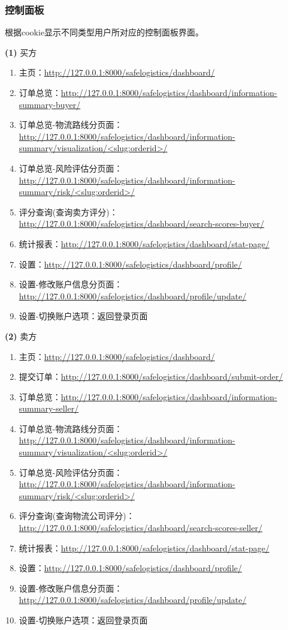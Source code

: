 \documentclass[12pt]{article}
\begin{document}
\subsubsection{控制面板} \par
根据cookie显示不同类型用户所对应的控制面板界面。\par 
\noindent \textbf{(1)} 买方 \par 
\begin{enumerate}
	\item 主页：\url{http://127.0.0.1:8000/safelogistics/dashboard/} 
	\item 订单总览：\url{http://127.0.0.1:8000/safelogistics/dashboard/information-summary-buyer/}
	\item 订单总览-物流路线分页面：\url{http://127.0.0.1:8000/safelogistics/dashboard/information-summary/visualization/<slug:orderid>/}
	\item 订单总览-风险评估分页面：\url{http://127.0.0.1:8000/safelogistics/dashboard/information-summary/risk/<slug:orderid>/}
	\item 评分查询(查询卖方评分)：\url{http://127.0.0.1:8000/safelogistics/dashboard/search-scores-buyer/}
	\item 统计报表：\url{http://127.0.0.1:8000/safelogistics/dashboard/stat-page/}
	\item 设置：\url{http://127.0.0.1:8000/safelogistics/dashboard/profile/}
	\item 设置-修改账户信息分页面：\url{http://127.0.0.1:8000/safelogistics/dashboard/profile/update/}
	\item 设置-切换账户选项：返回登录页面
\end{enumerate}

\noindent \textbf{(2)} 卖方 \par
\begin{enumerate}
	\item 主页：\url{http://127.0.0.1:8000/safelogistics/dashboard/} 
	\item 提交订单：\url{http://127.0.0.1:8000/safelogistics/dashboard/submit-order/}
	\item 订单总览：\url{http://127.0.0.1:8000/safelogistics/dashboard/information-summary-seller/}
	\item 订单总览-物流路线分页面：\url{http://127.0.0.1:8000/safelogistics/dashboard/information-summary/visualization/<slug:orderid>/}
	\item 订单总览-风险评估分页面：\url{http://127.0.0.1:8000/safelogistics/dashboard/information-summary/risk/<slug:orderid>/}
	\item 评分查询(查询物流公司评分)：\url{http://127.0.0.1:8000/safelogistics/dashboard/search-scores-seller/}
	\item 统计报表：\url{http://127.0.0.1:8000/safelogistics/dashboard/stat-page/}
	\item 设置：\url{http://127.0.0.1:8000/safelogistics/dashboard/profile/}
	\item 设置-修改账户信息分页面：\url{http://127.0.0.1:8000/safelogistics/dashboard/profile/update/}
	\item 设置-切换账户选项：返回登录页面
\end{enumerate} 
\end{document}
